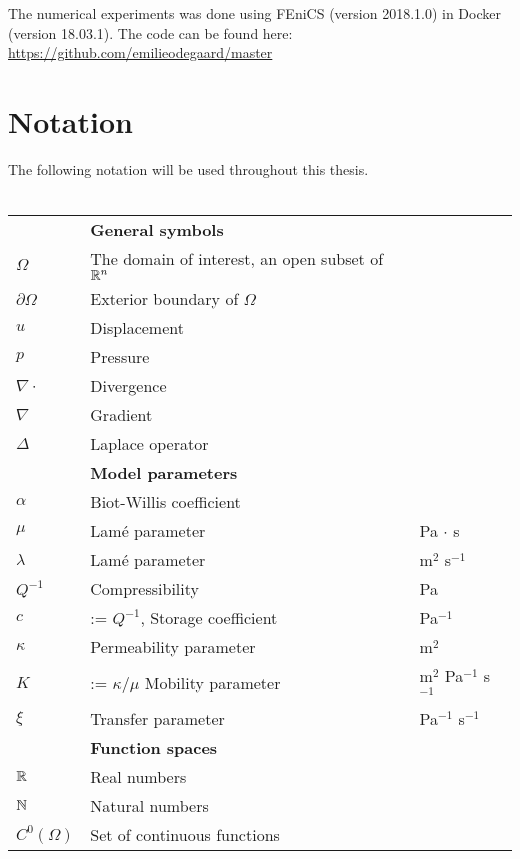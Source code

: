 \\
\\
The numerical experiments was done using FEniCS \cite{fenics} (version 2018.1.0) in Docker \cite{docker} (version 18.03.1). The code can be found here: \url{https://github.com/emilieodegaard/master}

\newpage
\section{Notation}
The following notation will be used throughout this thesis.
\\
\\
\begin{tabular}{lll}
                  & \textbf{General symbols} & \\[3pt]
    $\Omega $   & The domain of interest, an open subset of $\mathbb{R}^n$ &\\ [3pt]
    $\partial\Omega$   & Exterior boundary of $\Omega$ &\\[3pt]
    $u$  & Displacement &\\[3pt]
    $p$  & Pressure &\\[3pt]
    $\nabla \cdot $  & Divergence  & \\[3pt]
    $\nabla $ & Gradient  & \\[3pt]
    $\Delta$  & Laplace operator &\\[3pt]
                 & \textbf{Model parameters} & \\[3pt]
    $\alpha$  & Biot-Willis coefficient &  \\[3pt]
    $\mu$      & Lamé parameter & Pa $\cdot$ s  \\[3pt]
    $\lambda$  & Lamé parameter & m$^2$ s$^{-1}$  \\[3pt]
    $Q^{-1}$    & Compressibility  & Pa \\[3pt]
    $c$    & := $Q^{-1}$, Storage coefficient & Pa$^{-1}$\\[3pt]
 	$\kappa$   & Permeability parameter  & m$^{2}$\\[3pt]
    $K$   & := $\kappa / \mu$ Mobility parameter  & m$^{2}$ Pa$^{-1}$ s$^{-1}$\\[3pt]
    $\xi$     & Transfer parameter  & Pa$^{-1}$ s$^{-1}$\\[3pt]
                  & \textbf{Function spaces} & \\[3pt]
    $\mathbb{R}$ & Real numbers &  \\[3pt]
    $\mathbb{N}$ & Natural numbers & \\[3pt]
    $C^0(\Omega)$  & Set of continuous functions & \\[3pt]

\end{tabular}
